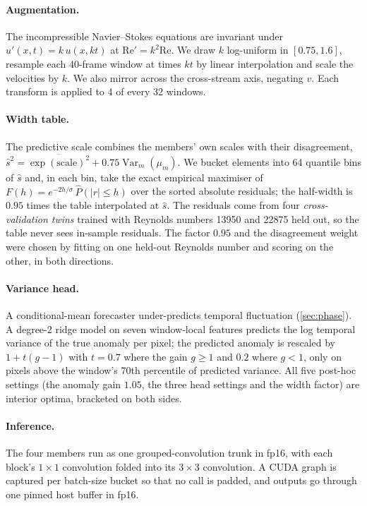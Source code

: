 \documentclass[10pt]{article}
\newcommand{\shat}{\hat{s}}
\begin{document}
\paragraph{Augmentation.} The incompressible Navier--Stokes equations are invariant under $u'(x,t)=k\,u(x,kt)$ at $\mathrm{Re}'=k^2\mathrm{Re}$. We draw $k$ log-uniform in $[0.75,1.6]$, resample each 40-frame window at times $kt$ by linear interpolation and scale the velocities by $k$. We also mirror across the cross-stream axis, negating $v$. Each transform is applied to 4 of every 32 windows.

\paragraph{Width table.}
\label{sec:width}
The predictive scale combines the members' own scales with their disagreement, $\shat^2=\overline{\exp(\mathrm{scale})^2}+0.75\operatorname{Var}_m(\mu_m)$. We bucket elements into 64 quantile bins of $\shat$ and, in each bin, take the exact empirical maximiser of $F(h)=e^{-2h/\sigma}\,\hat P(|r|\le h)$ over the sorted absolute residuals; the half-width is $0.95$ times the table interpolated at $\shat$. The residuals come from four \emph{cross-validation twins} trained with Reynolds numbers 13950 and 22875 held out, so the table never sees in-sample residuals. The factor $0.95$ and the disagreement weight were chosen by fitting on one held-out Reynolds number and scoring on the other, in both directions.

\paragraph{Variance head.} A conditional-mean forecaster under-predicts temporal fluctuation (\cref{sec:phase}). A degree-2 ridge model on seven window-local features predicts the log temporal variance of the true anomaly per pixel; the predicted anomaly is rescaled by $1+t(g-1)$ with $t=0.7$ where the gain $g\ge1$ and $0.2$ where $g<1$, only on pixels above the window's 70th percentile of predicted variance. All five post-hoc settings (the anomaly gain $1.05$, the three head settings and the width factor) are interior optima, bracketed on both sides.

\paragraph{Inference.} The four members run as one grouped-convolution trunk in fp16, with each block's $1\times1$ convolution folded into its $3\times3$ convolution. A CUDA graph is captured per batch-size bucket so that no call is padded, and outputs go through one pinned host buffer in fp16.
\end{document}
